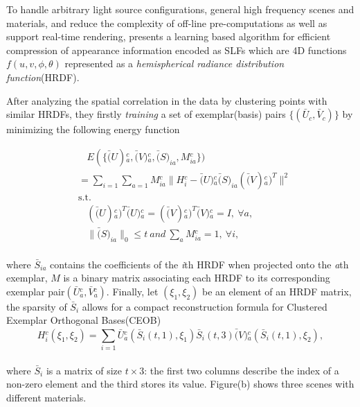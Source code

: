 To handle arbitrary light source configurations, general high frequency scenes and materials,
and reduce the complexity of off-line pre-computations as well as support real-time rendering,
\cite{miandji2013learning} presents a learning based algorithm for efficient compression of appearance information encoded as SLFs
which are 4D functions$f(u,v,\phi,\theta)$ represented as a \textit{hemispherical radiance distribution function}(HRDF).

After analyzing the spatial correlation in the data by clustering points with similar HRDFs,
they firstly \textit{training} a set of exemplar(basis) pairs $\{(\bar{U}_{c},\bar{V}_c)\}$ by minimizing the following energy function

\small{
\begin{equation}
 \label{eq:L1reconstruction}
 \begin{aligned}
 & ~~~~E(\{\bar(U){_{a}^{c}}, \bar(V){_{a}^{c}}, \bar(S)_{ia}, M{_{ia}^{c}}\}) \\
 & =\sum_{i=1}^{} \sum_{a=1}^{}
   M{_{ia}^{c}}
   \| H{_{i}^{c}} - \bar(U){_{a}^{c}} \bar(S)_{ia} (\bar(V){_{a}^{c}})^{T}\|^2 \\
 &\mathrm{s.t.} \\
 &~~~~  (\bar(U){_{a}^{c}})^{T} \bar(U){_{a}^{c}} = (\bar(V){_{a}^{c}})^{T} \bar(V){_{a}^{c}} = I,~\forall a,\\
 &~~~~  \| \bar(S)_{ia} \|_0 \le t ~and~ \sum_{a}^{} M{_{ia}^{c}}=1,~\forall i,
 \end{aligned}
\end{equation}
}
\\
where $\bar{S}_{ia}$ contains the coefficients of the \textit{i}th HRDF when projected onto the \textit{a}th exemplar, $M$ is a binary matrix associating each HRDF to its corresponding exemplar pair$(\bar{U}{_{a}^{c}},\bar{V}{_{a}^{c}})$. Finally, let $(\xi_1, \xi_2)$ be an element of an HRDF matrix, the sparsity of $\bar{S}_i$ allows for a compact reconstruction formula for Clustered Exemplar Orthogonal Bases(CEOB)
\small{
\begin{equation}
 \label{eq:L1reconstruction}
 H{_{i}^{c}}(\xi_1, \xi_2) = \sum_{i=1}^{} \bar{U}{_{a}^{c}}(\bar{S}_{i}(t,1), \xi_1) \bar{S}_{i}(t,3) \bar(V){_{a}^{c}}(\bar{S}_{i}(t,1), \xi_2),
\end{equation}
}
\\
where $\bar{S}_{i}$ is a matrix of size $t\times3$: the first two columns describe the index of a non-zero element and the third stores its value.
Figure(b) shows three scenes with different materials.

